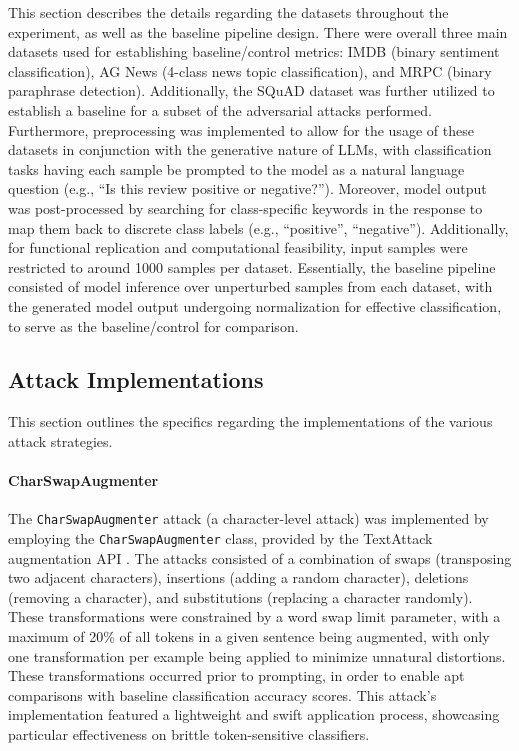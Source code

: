 \documentclass[conference]{IEEEtran}
\begin{document}
This section describes the details regarding the datasets throughout the experiment, as well as the baseline pipeline design. There were overall three main datasets used for establishing baseline/control metrics: IMDB (binary sentiment classification), AG News (4-class news topic classification), and MRPC (binary paraphrase detection). Additionally, the SQuAD dataset was further utilized to establish a baseline for a subset of the adversarial attacks performed. Furthermore, preprocessing was implemented to allow for the usage of these datasets in conjunction with the generative nature of LLMs, with classification tasks having each sample be prompted to the model as a natural language question (e.g., ``Is this review positive or negative?''). Moreover, model output was post-processed by searching for class-specific keywords in the response to map them back to discrete class labels (e.g., ``positive'', ``negative''). Additionally, for functional replication and computational feasibility, input samples were restricted to around 1000 samples per dataset. Essentially, the baseline pipeline consisted of model inference over unperturbed samples from each dataset, with the generated model output undergoing normalization for effective classification, to serve as the baseline/control for comparison.

\subsection{Attack Implementations}

This section outlines the specifics regarding the implementations of the various attack strategies.

\paragraph{CharSwapAugmenter}
The \texttt{CharSwapAugmenter} attack (a character-level attack) was implemented by employing the \texttt{CharSwapAugmenter} class, provided by the TextAttack augmentation API \cite{textattack2020framework}. The attacks consisted of a combination of swaps (transposing two adjacent characters), insertions (adding a random character), deletions (removing a character), and substitutions (replacing a character randomly). These transformations were constrained by a word swap limit parameter, with a maximum of 20\% of all tokens in a given sentence being augmented, with only one transformation per example being applied to minimize unnatural distortions. These transformations occurred prior to prompting, in order to enable apt comparisons with baseline classification accuracy scores. This attack’s implementation featured a lightweight and swift application process, showcasing particular effectiveness on brittle token-sensitive classifiers.
\end{document}
